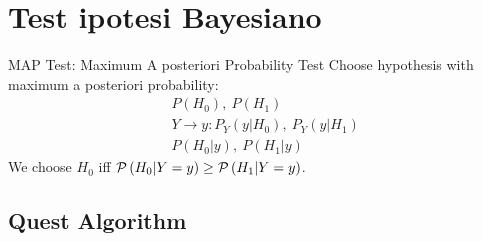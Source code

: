 \documentclass[asd-beamer.tex]{subfiles}%
\begin{document}
	
\section{Test ipotesi Bayesiano}

\begin{frame}{MAP Test: Maximum A posteriori Probability Test}
Choose hypothesis with maximum a posteriori probability:
\begin{align*}
    &P(H_0),\ P(H_1)\tag{prior}\\
    &Y\to y: P_Y(y|H_0),\ P_Y(y|H_1)\tag{$y\to L$}\\
    &P(H_0|y),\ P(H_1|y)\tag{posterior}
\end{align*}
We choose $H_0$ iff $\operatorname{\mathcal{P}}{(H_0|Y=y)}\geq\operatorname{\mathcal{P}}{(H_1|Y=y)}$.
\end{frame}

\subsection{Quest Algorithm}
\end{document}
